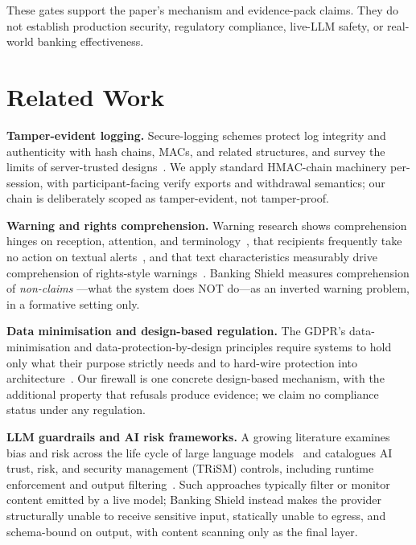 \documentclass[conference]{IEEEtran}
\newcommand{\sys}{Banking Shield}
\begin{document}
\noindent These gates support the paper's mechanism and evidence-pack claims.
They do not establish production security, regulatory compliance, live-LLM
safety, or real-world banking effectiveness.

\section{Related Work}

\textbf{Tamper-evident logging.} Secure-logging schemes protect log integrity
and authenticity with hash chains, MACs, and related structures, and survey the
limits of server-trusted designs~\cite{sree2019secure,ali2022bcals}. We apply
standard HMAC-chain machinery per-session, with participant-facing verify exports
and withdrawal semantics; our chain is deliberately scoped as tamper-evident, not
tamper-proof.

\textbf{Warning and rights comprehension.} Warning research shows comprehension
hinges on reception, attention, and terminology~\cite{lindell2012protective},
that recipients frequently take no action on textual alerts~\cite{kim2019wireless},
and that text characteristics measurably drive comprehension of rights-style
warnings~\cite{scherr2016text}. \sys{} measures comprehension of \emph{non-claims}
---what the system does NOT do---as an inverted warning problem, in a formative
setting only.

\textbf{Data minimisation and design-based regulation.} The GDPR's
data-minimisation and data-protection-by-design principles require systems to
hold only what their purpose strictly needs and to hard-wire protection into
architecture~\cite{klein2022pond,yeung2022demystifying,bradshaw2019privacy}. Our
firewall is one concrete design-based mechanism, with the additional property
that refusals produce evidence; we claim no compliance status under any
regulation.

\textbf{LLM guardrails and AI risk frameworks.} A growing literature examines
bias and risk across the life cycle of large language models~\cite{lee2024lifecycle}
and catalogues AI trust, risk, and security management (TRiSM) controls,
including runtime enforcement and output filtering~\cite{ray2026trism}. Such
approaches typically filter or monitor content emitted by a live model; \sys{}
instead makes the provider structurally unable to receive sensitive input,
statically unable to egress, and schema-bound on output, with content scanning
only as the final layer.
\end{document}
